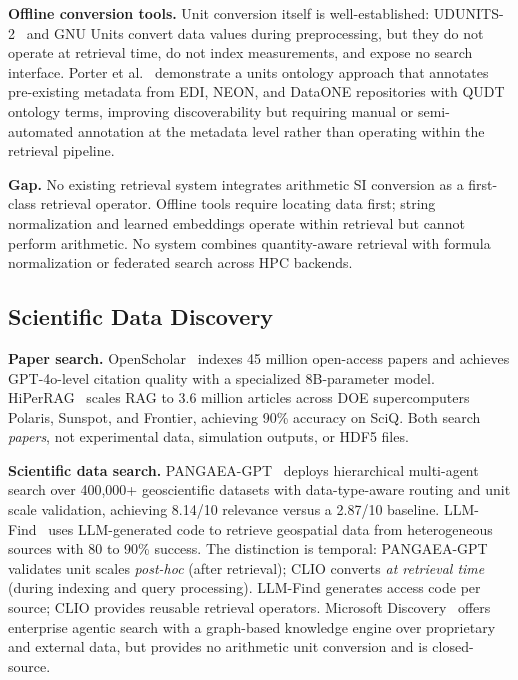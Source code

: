 \textbf{Offline conversion tools.} Unit conversion itself is well-established: UDUNITS-2~\cite{udunits2} and GNU Units convert data values during preprocessing, but they do not operate at retrieval time, do not index measurements, and expose no search interface. Porter et al.~\cite{units_ontology2025} demonstrate a units ontology approach that annotates pre-existing metadata from EDI, NEON, and DataONE repositories with QUDT ontology terms, improving discoverability but requiring manual or semi-automated annotation at the metadata level rather than operating within the retrieval pipeline.

\textbf{Gap.} No existing retrieval system integrates arithmetic SI conversion as a first-class retrieval operator. Offline tools require locating data first; string normalization and learned embeddings operate within retrieval but cannot perform arithmetic. No system combines quantity-aware retrieval with formula normalization or federated search across HPC backends.

\subsection{Scientific Data Discovery}

\textbf{Paper search.} OpenScholar~\cite{openscholar2026} indexes 45 million open-access papers and achieves GPT-4o-level citation quality with a specialized 8B-parameter model. HiPerRAG~\cite{hiperrag2025} scales RAG to 3.6 million articles across DOE supercomputers Polaris, Sunspot, and Frontier, achieving 90\% accuracy on SciQ. Both search \emph{papers}, not experimental data, simulation outputs, or HDF5 files.

\textbf{Scientific data search.} PANGAEA-GPT~\cite{pangaeagpt2026} deploys hierarchical multi-agent search over 400,000+ geoscientific datasets with data-type-aware routing and unit scale validation, achieving 8.14/10 relevance versus a 2.87/10 baseline. LLM-Find~\cite{llmfind2025} uses LLM-generated code to retrieve geospatial data from heterogeneous sources with 80 to 90\% success. The distinction is temporal: PANGAEA-GPT validates unit scales \emph{post-hoc} (after retrieval); CLIO converts \emph{at retrieval time} (during indexing and query processing). LLM-Find generates access code per source; CLIO provides reusable retrieval operators. Microsoft Discovery~\cite{microsoft_discovery2025} offers enterprise agentic search with a graph-based knowledge engine over proprietary and external data, but provides no arithmetic unit conversion and is closed-source.

